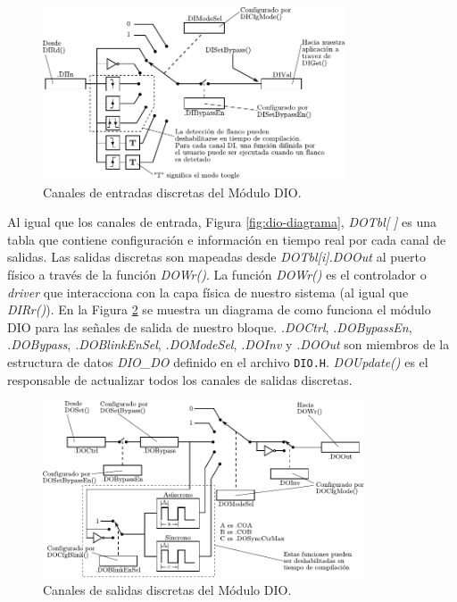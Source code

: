 \documentclass[11pt,a4paper,oneside]{article}
\begin{document}
\begin{figure}[h]
  \centering
  \includegraphics[width=0.8\textwidth]{images/dio_input}
  \caption{Canales de entradas discretas del Módulo DIO.}
  \label{fig:dio-input}
\end{figure}

Al igual que los canales de entrada, Figura \ref{fig:dio-diagrama}, \emph{DOTbl[ ]} es una tabla que contiene configuración e información en tiempo real por cada canal de salidas. Las salidas discretas son mapeadas desde \emph{DOTbl[i].DOOut} al puerto físico a través de la función \emph{DOWr()}. La función \emph{DOWr()} es el controlador o \textsl{driver} que interacciona con la capa física de nuestro sistema (al igual que \emph{DIRr()}). En la Figura \ref{fig:dio-output} se muestra un diagrama de como funciona el módulo DIO para las señales de salida de nuestro bloque. \emph{.DOCtrl}, \emph{.DOBypassEn}, \emph{.DOBypass}, \emph{.DOBlinkEnSel}, \emph{.DOModeSel}, \emph{.DOInv} y \emph{.DOOut} son miembros de la estructura de datos \emph{DIO\_DO} definido en el archivo \texttt{DIO.H}. \emph{DOUpdate()} es el responsable de actualizar todos los canales de salidas discretas.

\begin{figure}[h]
  \centering
  \includegraphics[width=0.85\textwidth]{images/dio_output}
  \caption{Canales de salidas discretas del Módulo DIO.}
  \label{fig:dio-output}
\end{figure}
\end{document}
